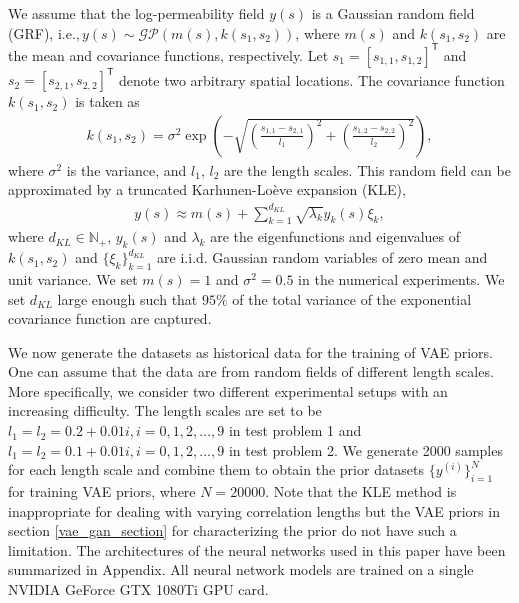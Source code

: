 We assume that the log-permeability field $y(s)$ is a Gaussian random field (GRF), i.e.,\,$y(s)\sim \mathcal{GP}\left(m(s),k(s_1,s_2)\right)$, where $m(s)$ and $k(s_1,s_2)$ are the mean and covariance functions, respectively. Let $s_1=[s_{1,1},s_{1,2}]^\mathsf{T}$ and $s_2=[s_{2,1},s_{2,2}]^\mathsf{T}$ denote two arbitrary spatial locations. The covariance function $k(s_1,s_2)$ is taken as
\begin{align}\label{covariance}
    k(s_1,s_2)=\sigma^2\exp\left(-\sqrt{\left(\frac{s_{1,1}-s_{2,1}}{l_1}\right)^2+\left(\frac{s_{1,2}-s_{2,2}}{l_2}\right)^2}\right),
\end{align}
where $\sigma^2$ is the variance, and $l_1,\,l_2$ are the length scales. 
This random field can be approximated by
a truncated Karhunen-Lo{\`e}ve expansion (KLE),
\begin{align}
    y(s)\approx m(s)+\sum_{k=1}^{d_{KL}}\sqrt{\lambda_k}y_k(s)\xi_k,
\end{align}
where $d_{KL}\in\mathbb{N}_+$, $y_k(s)$ and $\lambda_k$ are the eigenfunctions and
eigenvalues of $k(s_1,s_2)$ and $\{\xi_k\}_{k=1}^{d_{KL}}$ are i.i.d. Gaussian random variables of zero mean and unit variance. 
We set $m(s)=1$ and $\sigma^2=0.5$ in the numerical experiments. %
We set $d_{KL}$ large enough such that $95\%$ of the total variance of the exponential covariance function are captured. 

We now generate the datasets as historical data for the training of VAE priors. 
 One can assume that the data are from random fields of different length scales. 
 More specifically, we consider two different experimental setups with an increasing difficulty. The length scales are set to be $l_1 = l_2 = 0.2 + 0.01i,i = 0, 1, 2,\dots, 9$ in test problem 1 and 
 $l_1 = l_2 = 0.1 + 0.01i,i = 0, 1, 2,\dots, 9$ in test problem 2.
We generate 2000 samples for each length scale and combine them to obtain the prior datasets $\{y^{(i)}\}_{i=1}^N$ for training VAE priors, where $N=20000$. Note that the KLE method
is inappropriate for dealing with varying correlation lengths but the VAE priors in section \ref{vae_gan_section} for characterizing the prior do not have such a limitation.  The architectures of the neural networks used in this paper have been summarized in Appendix. All neural network models are trained on a single NVIDIA GeForce GTX 1080Ti GPU card.

